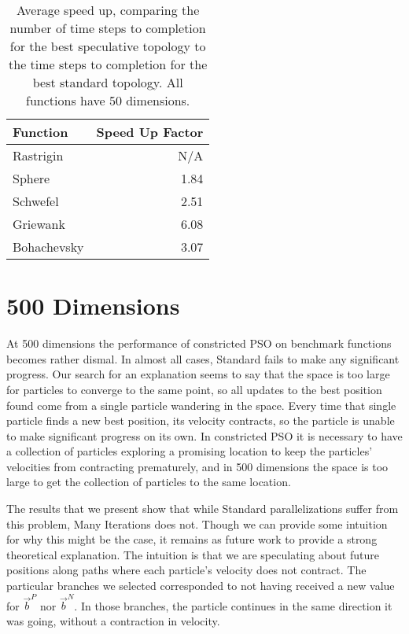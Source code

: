 \documentclass[ms,electronic,twosidetoc,letterpaper,chaptercenter,parttop,equalmargins]{byumsphd}
\providecommand{\pers}{\ensuremath{P}}
\providecommand{\neigh}{\ensuremath{N}}
\providecommand{\nbest}{\ensuremath{\Vec{b}^\neigh}}
\providecommand{\pbest}{\ensuremath{\Vec{b}^\pers}}
\begin{document}
\begin{table}
  \caption{Average speed up, comparing the number of time steps to completion
  for the best speculative topology to the time steps to completion for the
  best standard topology.  All functions have 50 dimensions.}
  \label{tab:50dims-summary}
  \centering
  \begin{tabular}{|l|r|}
	\hline
	Function&Speed Up Factor\\
	\hline
	\hline
	Rastrigin&N/A\\
	\hline
	Sphere&1.84\\
	\hline
	Schwefel&2.51\\
	\hline
	Griewank&6.08\\
	\hline
	Bohachevsky&3.07\\
	\hline
  \end{tabular}
\end{table}

\section{500 Dimensions}
\label{sec:500dims}

At 500 dimensions the performance of constricted PSO on benchmark functions
becomes rather dismal.  In almost all cases, Standard fails to make any
significant progress.  Our search for an explanation seems to say that the
space is too large for particles to converge to the same point, so all updates
to the best position found come from a single particle wandering in the space.
Every time that single particle finds a new best position, its velocity
contracts, so the particle is unable to make significant progress on its own.
In constricted PSO it is necessary to have a collection of particles exploring
a promising location to keep the particles' velocities from contracting
prematurely, and in 500 dimensions the space is too large to get the collection
of particles to the same location.

The results that we present show that while Standard parallelizations suffer
from this problem, Many Iterations does not.  Though we can provide some
intuition for why this might be the case, it remains as future work to provide
a strong theoretical explanation.  The intuition is that we are speculating
about future positions along paths where each particle's velocity does not
contract.  The particular branches we selected corresponded to not having
received a new value for $\pbest$ nor $\nbest$.  In those branches, the
particle continues in the same direction it was going, without a contraction in
velocity.
\end{document}
